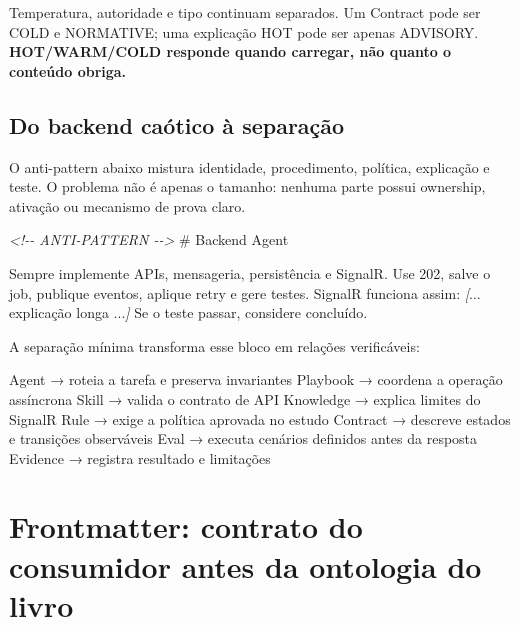 \documentclass[
  10pt,
  a4paper,
  oneside]{book}
\newenvironment{Shaded}{}{}
\newcommand{\CommentTok}[1]{\textcolor[rgb]{0.38,0.63,0.69}{\textit{#1}}}
\newcommand{\FunctionTok}[1]{\textcolor[rgb]{0.02,0.16,0.49}{#1}}
\newcommand{\NormalTok}[1]{#1}
\newcommand{\OtherTok}[1]{\textcolor[rgb]{0.00,0.44,0.13}{#1}}
\renewenvironment{Shaded}{\begin{snugshade}}{\end{snugshade}}%
\begin{document}
Temperatura, autoridade e tipo continuam separados. Um Contract pode ser
COLD e NORMATIVE; uma explicação HOT pode ser apenas ADVISORY.
\textbf{HOT/WARM/COLD responde quando carregar, não quanto o conteúdo
obriga.}

\hypertarget{do-backend-cauxf3tico-uxe0-separauxe7uxe3o}{%
\subsection{Do backend caótico à
separação}\label{do-backend-cauxf3tico-uxe0-separauxe7uxe3o}}

O anti-pattern abaixo mistura identidade, procedimento, política,
explicação e teste. O problema não é apenas o tamanho: nenhuma parte
possui ownership, ativação ou mecanismo de prova claro.

\begin{Shaded}
\begin{Highlighting}[]
\CommentTok{\textless{}!{-}{-} ANTI{-}PATTERN {-}{-}\textgreater{}}
\FunctionTok{\# Backend Agent}

\NormalTok{Sempre implemente APIs, mensageria, persistência e SignalR.}
\NormalTok{Use 202, salve o job, publique eventos, aplique retry e gere testes.}
\NormalTok{SignalR funciona assim: }\CommentTok{[}\OtherTok{... explicação longa ...}\CommentTok{]}
\NormalTok{Se o teste passar, considere concluído.}
\end{Highlighting}
\end{Shaded}

A separação mínima transforma esse bloco em relações verificáveis:

\begin{Shaded}
\begin{Highlighting}[]
\NormalTok{Agent → roteia a tarefa e preserva invariantes}
\NormalTok{Playbook → coordena a operação assíncrona}
\NormalTok{Skill → valida o contrato de API}
\NormalTok{Knowledge → explica limites do SignalR}
\NormalTok{Rule → exige a política aprovada no estudo}
\NormalTok{Contract → descreve estados e transições observáveis}
\NormalTok{Eval → executa cenários definidos antes da resposta}
\NormalTok{Evidence → registra resultado e limitações}
\end{Highlighting}
\end{Shaded}

\hypertarget{frontmatter-contrato-do-consumidor-antes-da-ontologia-do-livro}{%
\section{Frontmatter: contrato do consumidor antes da ontologia do
livro}\label{frontmatter-contrato-do-consumidor-antes-da-ontologia-do-livro}}
\end{document}

